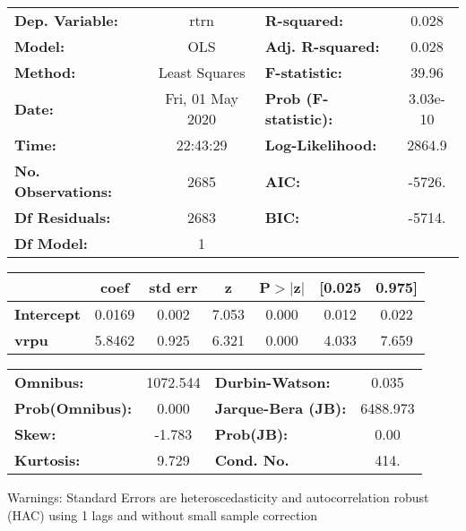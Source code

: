 \begin{center}
\begin{tabular}{lclc}
\toprule
\textbf{Dep. Variable:}    &       rtrn       & \textbf{  R-squared:         } &     0.028   \\
\textbf{Model:}            &       OLS        & \textbf{  Adj. R-squared:    } &     0.028   \\
\textbf{Method:}           &  Least Squares   & \textbf{  F-statistic:       } &     39.96   \\
\textbf{Date:}             & Fri, 01 May 2020 & \textbf{  Prob (F-statistic):} &  3.03e-10   \\
\textbf{Time:}             &     22:43:29     & \textbf{  Log-Likelihood:    } &    2864.9   \\
\textbf{No. Observations:} &        2685      & \textbf{  AIC:               } &    -5726.   \\
\textbf{Df Residuals:}     &        2683      & \textbf{  BIC:               } &    -5714.   \\
\textbf{Df Model:}         &           1      & \textbf{                     } &             \\
\bottomrule
\end{tabular}
\begin{tabular}{lcccccc}
                   & \textbf{coef} & \textbf{std err} & \textbf{z} & \textbf{P$> |$z$|$} & \textbf{[0.025} & \textbf{0.975]}  \\
\midrule
\textbf{Intercept} &       0.0169  &        0.002     &     7.053  &         0.000        &        0.012    &        0.022     \\
\textbf{vrpu}      &       5.8462  &        0.925     &     6.321  &         0.000        &        4.033    &        7.659     \\
\bottomrule
\end{tabular}
\begin{tabular}{lclc}
\textbf{Omnibus:}       & 1072.544 & \textbf{  Durbin-Watson:     } &    0.035  \\
\textbf{Prob(Omnibus):} &   0.000  & \textbf{  Jarque-Bera (JB):  } & 6488.973  \\
\textbf{Skew:}          &  -1.783  & \textbf{  Prob(JB):          } &     0.00  \\
\textbf{Kurtosis:}      &   9.729  & \textbf{  Cond. No.          } &     414.  \\
\bottomrule
\end{tabular}
\end{center}

Warnings: \newline
 [1] Standard Errors are heteroscedasticity and autocorrelation robust (HAC) using 1 lags and without small sample correction